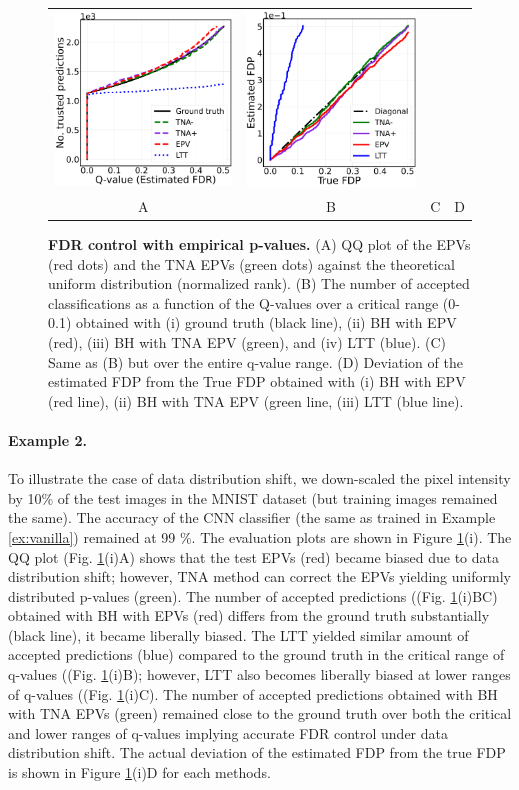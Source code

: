 \documentclass{article}
\begin{document}
\begin{figure}[h!]
\begin{tabular}{cccc}
		\includegraphics[width=0.225\linewidth, height=0.225\linewidth]{img/cnn_balanced_fdr_control.png} & 
		\includegraphics[width=0.225\linewidth, height=0.225\linewidth]{img/cnn_FDPscat_balanced.png} \\		
		A & B & C & D \\
	\end{tabular}
	\caption{{\bf  FDR control with empirical p-values.}
		(A) QQ plot of the EPVs (red dots) and the TNA EPVs (green dots) against the theoretical uniform distribution (normalized rank). (B) The number of accepted classifications as a function of the Q-values over a critical range (0-0.1) obtained with (i) ground truth (black line), (ii) BH with EPV (red), (iii) BH with TNA EPV (green), and (iv) LTT (blue). (C) Same as (B) but over the entire q-value range. (D) Deviation of the estimated FDP from the True FDP obtained with (i) BH with EPV (red line), (ii) BH with TNA EPV  (green line, (iii) LTT (blue line).}
	\label{fig:mnist_shfit}
\end{figure}

	
\paragraph{Example 2.} To illustrate the case of data distribution shift, we down-scaled the pixel intensity by 10\% of the test images in the MNIST dataset (but training images remained the same). The accuracy of the CNN classifier (the same as trained in Example \ref{ex:vanilla}) remained at 99 \%. The evaluation plots are shown in Figure \ref{fig:mnist_shfit}(i). The QQ plot (Fig. \ref{fig:mnist_shfit}(i)A) shows that the test EPVs (red) became biased due to data distribution shift; however, TNA method can correct the EPVs yielding uniformly distributed p-values (green). The number of accepted predictions ((Fig. \ref{fig:mnist_shfit}(i)BC) obtained with BH with EPVs (red) differs from the ground truth substantially (black line), it became liberally biased. The LTT yielded similar amount of accepted predictions (blue) compared to the ground truth in the critical range of q-values ((Fig. \ref{fig:mnist_shfit}(i)B); however, LTT also becomes liberally biased at lower ranges of q-values ((Fig. \ref{fig:mnist_shfit}(i)C). The number of accepted predictions obtained with BH with TNA EPVs (green) remained close to the ground truth over both the critical and lower ranges of q-values implying accurate FDR control under data distribution shift. The actual deviation of the estimated FDP from the true FDP is shown in Figure \ref{fig:mnist_shfit}(i)D for each methods. 
\end{document}
